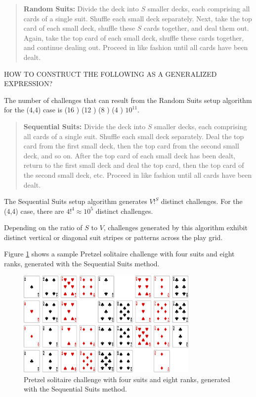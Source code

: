 \documentclass[journal]{IEEEtran}
\begin{document}
\begin{quote}
    {\bf Random Suits:} Divide the deck into $S$ smaller decks, each comprising all cards of a single suit. Shuffle each small deck separately. Next, take the top card of each small deck, shuffle these $S$ cards together, and deal them out. Again, take the top card of each small deck, shuffle these cards together, and continue dealing out. Proceed in like fashion until all cards have been dealt.
\end{quote}

HOW TO CONSTRUCT THE FOLLOWING AS A GENERALIZED EXPRESSION?

The number of challenges that can result from the Random Suits setup algorithm for the (4,4) case is
(16   ) \times (12   ) \times (8   ) \times (4   ) \approx $10^{11}$.

\begin{quote}
    {\bf Sequential Suits:} Divide the deck into $S$ smaller decks, each comprising all cards of a single suit. Shuffle each small deck separately. Deal the top card from the first small deck, then the top card from the second small deck, and so on.  After the top card of each small deck has been dealt, return to the first small deck and deal the top card, then the top card of the second small deck, etc. Proceed in like fashion until all cards have been dealt.
\end{quote}

The Sequential Suits setup algorithm generates $V!^{S}$ distinct challenges. For the (4,4) case, there are $4!^{4} \approx 10^{5}$ distinct challenges.

Depending on the ratio of $S$ to $V$, challenges generated by this algorithm exhibit distinct vertical or diagonal suit stripes or patterns across the play grid.

Figure \ref{fig:pretzelsequential} shows a sample Pretzel solitaire challenge with four suits and eight ranks, generated with the Sequential Suits method.

\begin{figure}[t]
\centering
\includegraphics[width=8.8cm]{pretzel4x8.png}
\caption{Pretzel solitaire challenge with four suits and eight ranks, generated with the Sequential Suits method.}
\label{fig:pretzelsequential}
\end{figure}
\end{document}
